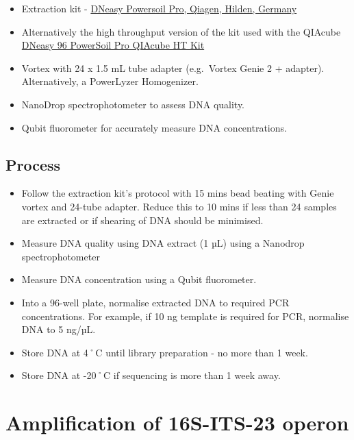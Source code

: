 \documentclass[
]{book}
\providecommand{\tightlist}{%
  \setlength{\itemsep}{0pt}\setlength{\parskip}{0pt}}
\begin{document}
\begin{itemize}
\tightlist
\item
  Extraction kit - \href{https://www.qiagen.com/au/resources/resourcedetail?id=9bb59b74-e493-4aeb-b6c1-f660852e8d97&lang=en}{DNeasy Powersoil Pro, Qiagen, Hilden, Germany}
\item
  Alternatively the high throughput version of the kit used with the QIAcube \href{https://rmiteduau-my.sharepoint.com/personal/christian_krohn_rmit_edu_au/Documents/Experiments/2025_ETPSequencingProject/_\%09https:/www.qiagen.com/au/products/discovery-and-translational-research/dna-rna-purification/dna-purification/microbial-dna/dneasy-96-powersoil-pro-qiacube-ht-kit}{DNeasy 96 PowerSoil Pro QIAcube HT Kit}
\item
  Vortex with 24 x 1.5 mL tube adapter (e.g.~Vortex Genie 2 + adapter). Alternatively, a PowerLyzer Homogenizer.
\item
  NanoDrop spectrophotometer to assess DNA quality.
\item
  Qubit fluorometer for accurately measure DNA concentrations.
\end{itemize}

\subsection{Process}\label{process}

\begin{itemize}
\tightlist
\item
  Follow the extraction kit's protocol with 15 mins bead beating with Genie vortex and 24-tube adapter. Reduce this to 10 mins if less than 24 samples are extracted or if shearing of DNA should be minimised.
\item
  Measure DNA quality using DNA extract (1 µL) using a Nanodrop spectrophotometer
\item
  Measure DNA concentration using a Qubit fluorometer.
\item
  Into a 96-well plate, normalise extracted DNA to required PCR concentrations. For example, if 10 ng template is required for PCR, normalise DNA to 5 ng/µL.\\
\item
  Store DNA at 4˚C until library preparation - no more than 1 week.
\item
  Store DNA at -20˚C if sequencing is more than 1 week away.
\end{itemize}

\section{Amplification of 16S-ITS-23 operon}\label{amplification-of-16s-its-23-operon}
\end{document}
